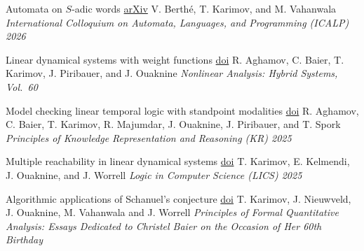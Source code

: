 \documentclass{article}
\begin{document}
	\begin{etaremune}
		\item
		{\large *Automata on $S$-adic words}\quad
		\href{https://arxiv.org/abs/2506.17460}{arXiv}
		\vspace{0.2cm} \newline
		V. Berth\'e, T. Karimov, and M. Vahanwala
		\vspace*{0.25cm}\newline
		\emph{International Colloquium on Automata, Languages, and Programming (ICALP) 2026}
		\vspace*{0.2cm}
		
		\item 
		{\large *Linear dynamical systems with weight functions} \quad
		\href{https://doi.org/10.1016/j.nahs.2026.101680}{doi}
		\vspace*{0.2cm}\newline
		R. Aghamov, C. Baier, T. Karimov, J. Piribauer, and J. Ouaknine
		\vspace*{0.25cm}\newline
		\emph{Nonlinear Analysis: Hybrid Systems, Vol.\ 60}
		\vspace*{0.2cm}
		
		\item
		{\large Model checking linear temporal logic with standpoint modalities}
		\quad
		\href{https://doi.org/10.24963/kr.2025/}{doi}
		\vspace*{0.2cm}\newline
		R. Aghamov, C. Baier, T. Karimov, R. Majumdar, J. Ouaknine, J. Piribauer, and T. Spork%
		\vspace*{0.25cm}\newline 
		\emph{Principles of Knowledge Representation and Reasoning (KR) 2025}
		\vspace{0.2cm}
		
		\item
		{\large Multiple reachability in linear dynamical systems}
		\quad
		\href{https://doi.org/10.1109/LICS65433.2025.00055}{doi}
		\vspace*{0.2cm}\newline
		T. Karimov, E. Kelmendi, J. Ouaknine, and J. Worrell
		\vspace*{0.25cm}\newline
		\emph{Logic in Computer Science (LICS) 2025}
		\vspace{0.2cm}
		
		\item
		{\large Algorithmic applications of Schanuel's conjecture}
		\quad
		\href{https://doi.org/10.1007/978-3-031-97439-7_5}{doi}
		\vspace*{0.2cm}\newline
		T. Karimov, J. Nieuwveld, J. Ouaknine, M. Vahanwala and J. Worrell
		\vspace*{0.25cm}\newline
		\emph{Principles of Formal Quantitative Analysis: Essays Dedicated to Christel Baier on the Occasion of Her 60th Birthday}
		\vspace{0.2cm}
		

\end{etaremune}
\end{document}

